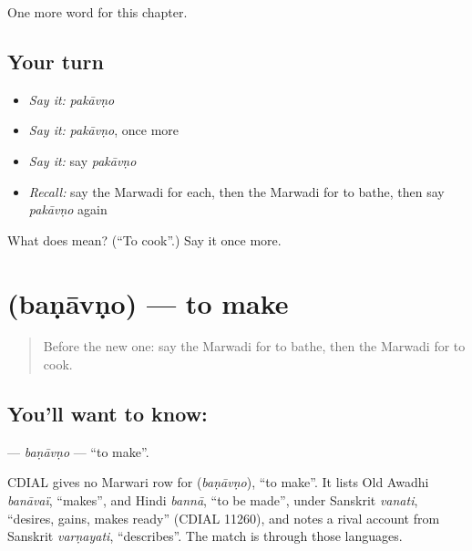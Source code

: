 \begin{grammarlens}[title={What you've built}]
One more word for this chapter.
\end{grammarlens}

\subsection*{Your turn}
\begin{itemize}
\raggedright
  \item \emph{Say it:} \emph{pakāvṇo}
  \item \emph{Say it:} \emph{pakāvṇo}, once more
  \item \emph{Say it:} say \emph{pakāvṇo}
  \item \emph{Recall:} say the Marwadi for each, then the Marwadi for to bathe, then say \emph{pakāvṇo} again
\end{itemize}

\begin{tcolorbox}[breakable,colback=teal!4,colframe=teal!35!black,title={Before you move on}]
What does  mean? (\textquotedblleft{}To cook\textquotedblright{}.) Say it once more.
\end{tcolorbox}
\section[\texorpdfstring{\mw{बणावणो} (baṇāvṇo)}{बणावणो (baṇāvṇo)}]{ (baṇāvṇo) — to make}

\label{lesson:MW-C103-banavno}



\begin{quote}
Before the new one: say the Marwadi for to bathe, then the Marwadi for to cook.
\end{quote}

\subsection*{You'll want to know: }
\textbf{} — \emph{baṇāvṇo} — \textquotedblleft{}to make\textquotedblright{}.

\begin{cousinweb}
CDIAL gives no Marwari row for \textbf{} (\emph{baṇāvṇo}), \textquotedblleft{}to make\textquotedblright{}. It lists Old Awadhi \emph{banāvaï}, \textquotedblleft{}makes\textquotedblright{}, and Hindi \emph{bannā}, \textquotedblleft{}to be made\textquotedblright{}, under Sanskrit \emph{vanati}, \textquotedblleft{}desires, gains, makes ready\textquotedblright{} (CDIAL 11260), and notes a rival account from Sanskrit \emph{varṇayati}, \textquotedblleft{}describes\textquotedblright{}. The match is through those languages.
\end{cousinweb}

